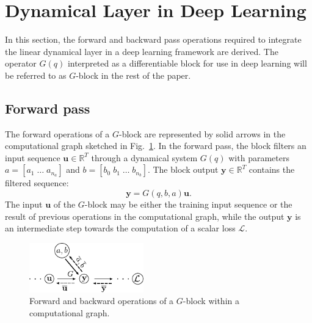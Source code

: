 \documentclass{article}
\newcommand{\q}{q} %
\newcommand{\ac}{a} %
\newcommand{\bb}{b} %
\newcommand{\tvec}[1]{\mathbf{#1}}
\newcommand{\nsamp}{T}
\newcommand{\loss}{\mathcal{L}}
\begin{document}
\section{Dynamical Layer in Deep Learning}
\label{sec:layer_DL}

In this section, the forward and backward pass operations required to integrate the linear dynamical layer in a deep learning framework are derived. The operator $G(q)$ interpreted as a differentiable block for use in deep learning will be referred to as $G$-block in the rest of the paper.


\subsection{Forward pass}
The forward operations of a $G$-block are represented by solid arrows  in the computational graph sketched in Fig.~\ref{fig:backprop_tf}. 
In the {forward pass}, the block filters an input sequence $\tvec{u} \in \mathbb{R}^{\nsamp}$ through a dynamical system $G(\q)$ with  parameters $\ac = [\ac_1\;\dots\;\ac_{n_\ac}]$ and $\bb = [\bb_0\; \bb_1\; \dots \;\bb_{n_\bb}]$. The block output   $\tvec{y} \in \mathbb{R}^{\nsamp}$ contains the filtered sequence:
\begin{equation}
\label{eq:forward_op}
\tvec{y} =  G(\q,b,a) \tvec{u}.
\end{equation}
The input $\tvec{u}$ of the $G$-block  may be either the training input sequence or the result of previous operations in the computational graph, while
the output $\tvec{y}$ is an intermediate step towards the computation of a scalar loss $\loss$. %
\begin{figure}%
	\begin{center}
		\includegraphics[width=140pt]{fig/backprop_tf_ab_circle.pdf}
	\end{center}
	\caption{Forward and backward operations of a $G$-block within a computational graph.}
	\label{fig:backprop_tf}
\end{figure} 
\end{document}
